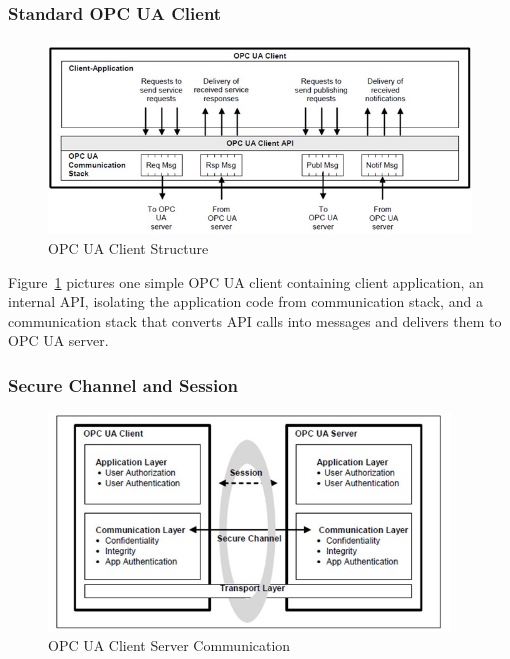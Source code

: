 \documentclass[]{llncs}
\begin{document}
\subsubsection{Standard OPC UA Client}
\begin{figure}[!htbp]
	\centering
	\includegraphics[width=1.1\textwidth]{client.jpg}
		\caption[ ]{OPC UA Client Structure\cite{O1}}
	\label{fig:client}
\end{figure}

Figure~\ref{fig:client} pictures one simple OPC UA client containing client application, an internal API, isolating the application code from communication stack, and a communication stack that converts API calls into messages and delivers them to OPC UA server.

\subsubsection{Secure Channel and Session}

\begin{figure}[!htbp]
	\centering
	\includegraphics[width=0.95\textwidth]{opc_ua_cs_comm.jpg}
		\caption[ ]{OPC UA Client Server Communication\cite{O2}}
	\label{fig:opc_ua_cs_comm}
\end{figure}
\end{document}
